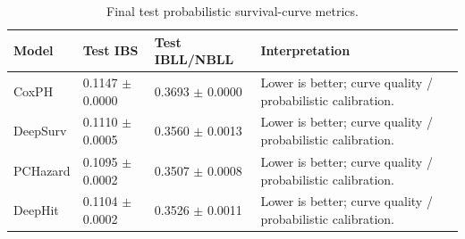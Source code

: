 \begin{table}
\caption{Final test probabilistic survival-curve metrics.}
\label{tab:static_probabilistic_metrics}
\begin{tabular}{llll}
\toprule
Model & Test IBS & Test IBLL/NBLL & Interpretation \\
\midrule
CoxPH & 0.1147 $\pm$ 0.0000 & 0.3693 $\pm$ 0.0000 & Lower is better; curve quality / probabilistic calibration. \\
DeepSurv & 0.1110 $\pm$ 0.0005 & 0.3560 $\pm$ 0.0013 & Lower is better; curve quality / probabilistic calibration. \\
PCHazard & 0.1095 $\pm$ 0.0002 & 0.3507 $\pm$ 0.0008 & Lower is better; curve quality / probabilistic calibration. \\
DeepHit & 0.1104 $\pm$ 0.0002 & 0.3526 $\pm$ 0.0011 & Lower is better; curve quality / probabilistic calibration. \\
\bottomrule
\end{tabular}
\end{table}

